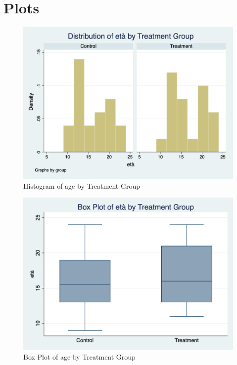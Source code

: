 \documentclass{article}
\begin{document}
\section{Plots}

\begin{figure}[h]
\centering
\includegraphics[scale=0.30]{histogram_eta_trad.png}
\caption{Histogram of age by Treatment Group}
\end{figure}

\begin{figure}[h]
\centering
\includegraphics[scale=0.30]{box_plot_eta_trad.png}
\caption{Box Plot of age by Treatment Group}
\end{figure}
\end{document}
